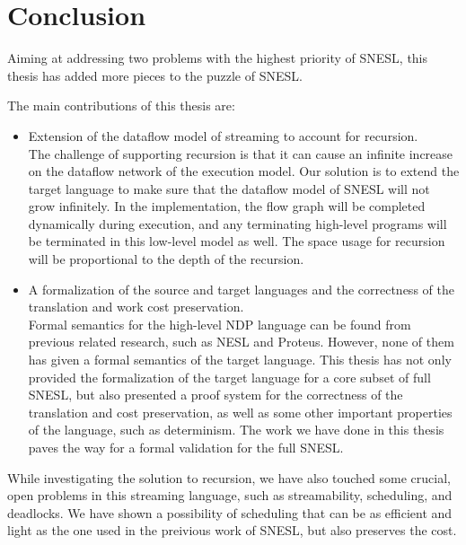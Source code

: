 \chapter{Conclusion}
Aiming at addressing two problems with the highest priority of SNESL, this thesis has added more pieces to the puzzle of SNESL.

The main contributions of this thesis are:
\begin{itemize}
	\item Extension of the dataflow model of streaming to account for recursion. \\
	The challenge of supporting recursion is that it can cause an infinite increase on the dataflow network of the execution model.
	Our solution is to extend the target language to make sure that the dataflow model of SNESL will not grow infinitely. 
	In the implementation, the flow graph will be completed dynamically during execution, and any terminating high-level programs will be terminated in this low-level model as well.
	The space usage for recursion will be proportional to the depth of the recursion. 
\item A formalization of the source and target languages and the correctness of the translation and work cost preservation.  \\
Formal semantics for the high-level NDP language can be found from previous related research, such as NESL and Proteus. However, none of them has given a formal semantics of the target language. 
This thesis has not only provided the formalization of the target language for a core subset of full SNESL, but also presented a proof system for the correctness of the translation and cost preservation, as well as some other important properties of the language, such as determinism.
The work we have done in this thesis paves the way for a formal validation for the full SNESL.
\end{itemize}

While investigating the solution to recursion, we have also touched some crucial, open problems in this streaming language,  such as streamability, scheduling, and deadlocks. 
We have shown a possibility of scheduling that can be as efficient and light as the one used in the preivious work of SNESL, but also preserves the cost.

